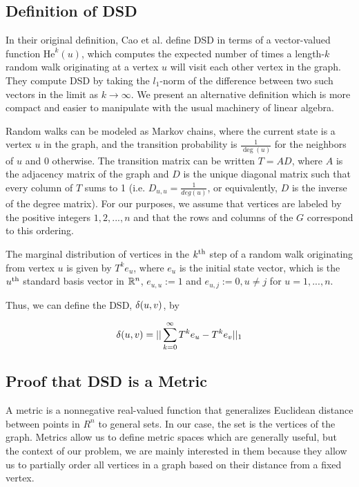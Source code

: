 \subsection*{Definition of DSD}

\noindent In their original definition, Cao et al. define DSD in terms of a
vector-valued function $\mathrm{He}^{k}(u)$, which computes the expected number of times
a length-$k$ random walk originating at a vertex $u$ will visit each other vertex
in the graph. They compute DSD by taking the $l_1$-norm of the difference
between two such vectors in the limit as $k \to \infty$. We present an
alternative definition which is more compact and easier to manipulate with the
usual machinery of linear algebra.


Random walks can be modeled as Markov chains, where the current state is a
vertex $u$ in the graph, and the transition probability is $\frac{1}{\deg(u)}$
for the neighbors of $u$ and $0$ otherwise. The transition matrix can be written
$T = AD$, where $A$ is the adjacency matrix of the graph and $D$ is the unique
diagonal matrix such that every column of $T$ sums to 1 (i.e.
$D_{u,u}=\frac{1}{deg(u)}$, or equivalently, $D$ is the inverse of the degree
matrix). For our purposes, we assume that vertices are labeled by the positive
integers $1,2,...,n$ and that the rows and columns of the $G$ correspond to this
ordering.

The marginal distribution of vertices in the $k^{\mathrm{th}}$ step of a random walk
originating from vertex $u$ is given by $T^ke_u$, where $e_u$ is the initial
state vector, which is the $u^{\mathrm{th}}$ standard basis vector in $\mathbb{R}^n$,
$e_{u,u} := 1$ and $e_{u,j} := 0, u \neq j$ for $u=1,...,n$.

Thus, we can define the DSD, $\delta(u,v)$, by

\[
  \delta(u,v) = ||\sum_{k =0}^{\infty}{T^ke_u - T^ke_v}||_1
\]

\subsection{Proof that DSD is a Metric}

A metric is a nonnegative real-valued function that generalizes Euclidean
distance between points in $R^n$ to general sets. In our case, the set is the
vertices of the graph. Metrics allow us to define metric spaces which are
generally useful, but the context of our problem, we are mainly interested in
them because they allow us to partially order all vertices in a graph based on
their distance from a fixed vertex.

